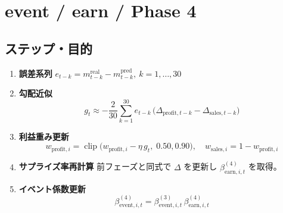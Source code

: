 
\section*{event / earn / Phase 4}\nopagebreak[4]
\subsection*{ステップ・目的}
\begin{flushleft}
\begin{enumerate}
  \item \textbf{誤差系列}\;
        \( e_{t-k}=m_{t-k}^{\text{real}}-m_{t-k}^{\text{pred}},\ k=1,\dots,30 \)

  \item \textbf{勾配近似}\;
        \[
          g_t \approx -\frac{2}{30}
            \sum_{k=1}^{30}
            e_{t-k}\,\bigl(\Delta_{\text{profit},t-k}-\Delta_{\text{sales},t-k}\bigr)
        \]

  \item \textbf{利益重み更新}\;
        \[
          w_{\text{profit},i}
            =\operatorname{clip}\bigl(w_{\text{profit},i}-\eta\,g_t,\;0.50,0.90\bigr),
          \quad
          w_{\text{sales},i}=1-w_{\text{profit},i}
        \]

  \item \textbf{サプライズ率再計算}\;
        前フェーズと同式で $\Delta$ を更新し $\beta_{\text{earn},i,t}^{(4)}$ を取得。

  \item \textbf{イベント係数更新}\;
        \[
          \beta_{\text{event},i,t}^{(4)}
            =\beta_{\text{event},i,t}^{(3)}\,
             \beta_{\text{earn},i,t}^{(4)}
        \]
\end{enumerate}
\end{flushleft}

